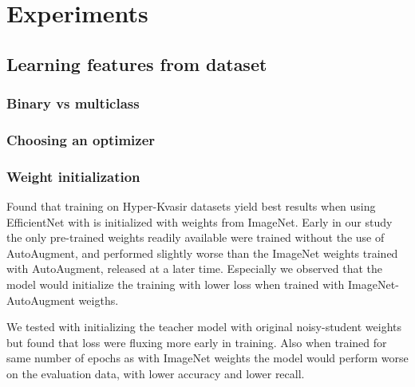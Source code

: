 \documentclass[thesis.tex]{subfiles}
\begin{document}
\chapter{Experiments} \label{chap:experiments}



\section{Learning features from dataset}


\subsection{Binary vs multiclass}




\subsection{Choosing an optimizer}




\subsection{Weight initialization}
Found that training on Hyper-Kvasir datasets yield best results when using EfficientNet with is initialized with weights from ImageNet. Early in our study the only pre-trained weights readily available were trained without the use of AutoAugment, and performed slightly worse than the ImageNet weights trained with AutoAugment, released at a later time. Especially we observed that the model would initialize the training with lower loss when trained with ImageNet-AutoAugment weigths.


We tested with initializing the teacher model with original noisy-student weights but found that loss were fluxing more early in training. Also when trained for same number of epochs as with ImageNet weights the model would perform worse on the evaluation data, with lower accuracy and lower recall.
\end{document}
